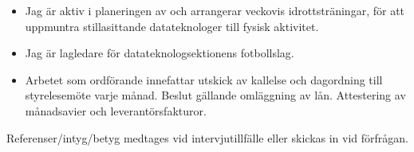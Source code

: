 \documentclass[10pt,a4paper,ragged2e]{altacv}
\begin{document}
\begin{fullwidth}

\begin{itemize}
  \item Jag är aktiv i planeringen av och arrangerar veckovis idrottsträningar, för att uppmuntra  stillasittande datateknologer till fysisk aktivitet. 
  \item Jag är lagledare för datateknologsektionens fotbollslag.
\end{itemize}

\divider

\begin{itemize}
  \item Arbetet som ordförande innefattar utskick av kallelse och dagordning till styrelesemöte varje månad. Beslut gällande omläggning av lån. Attestering av månadsavier och leverantörsfakturor.
\end{itemize}

\divider


\divider


\divider


Referenser/intyg/betyg medtages vid intervjutillfälle eller skickas in vid förfrågan.

\end{fullwidth}
\end{document}

